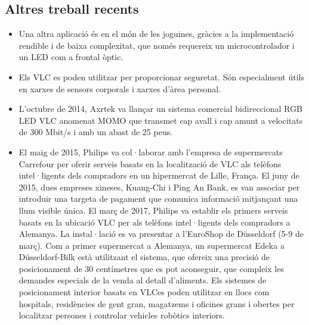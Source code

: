 \subsection*{Altres treball recents}


\begin{itemize}
    \item Una altra aplicació és en el món de les joguines, gràcies a la implementació rendible i de baixa complexitat, que només requereix un microcontrolador i un LED com a frontal òptic.
    \item Els VLC es poden utilitzar per proporcionar seguretat. Són especialment útils en xarxes de sensors corporals i xarxes d'àrea personal.
    \item L'octubre de 2014, Axrtek va llançar un sistema comercial bidireccional RGB LED VLC anomenat MOMO que transmet cap avall i cap amunt a velocitats de 300 Mbit/s i amb un abast de 25 peus.
    \item El maig de 2015, Philips va col·laborar amb l'empresa de supermercats Carrefour per oferir serveis basats en la localització de VLC als telèfons intel·ligents dels compradors en un hipermercat de Lille, França. El juny de 2015, dues empreses xineses, Kuang-Chi i Ping An Bank, es van associar per introduir una targeta de pagament que comunica informació mitjançant una llum visible única. El març de 2017, Philips va establir els primers serveis basats en la ubicació VLC per als telèfons intel·ligents dels compradors a Alemanya. La instal·lació es va presentar a l'EuroShop de Düsseldorf (5-9 de març). Com a primer supermercat a Alemanya, un supermercat Edeka a Düsseldorf-Bilk està utilitzant el sistema, que ofereix una precisió de posicionament de 30 centímetres que es pot aconseguir, que compleix les demandes especials de la venda al detall d'aliments. Els sistemes de posicionament interior basats en VLCes poden utilitzar en llocs com hospitals, residències de gent gran, magatzems i oficines grans i obertes per localitzar persones i controlar vehicles robòtics interiors.
\end{itemize}